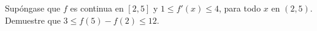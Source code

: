 \item Supóngase que $f$ es continua en $[2, 5]$ y $1 \le f'(x) \le 4$, para todo $x$ en $(2, 5)$. Demuestre que $3 \le f(5) - f(2) \le 12$.
